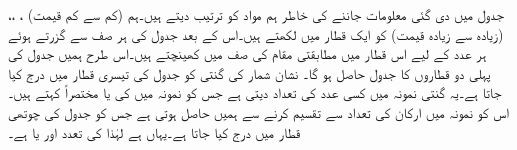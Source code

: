جدول  میں دی گئی معلومات جاننے کی خاطر ہم مواد کو ترتیب دیتے ہیں۔ہم (کم سے کم قیمت) ، ،،  (زیادہ سے زیادہ قیمت) کو ایک قطار میں لکھتے ہیں۔اس کے بعد جدول  کی ہر صف سے گزرتے ہوئے ہر عدد کے لیے اس قطار میں مطابقتی مقام کی صف میں  کھینچتے ہیں۔اس طرح ہمیں جدول  کی پہلی دو قطاروں  کا جدول حاصل ہو گا۔ نشان شمار کی گنتی کو جدول کی تیسری قطار میں درج کیا جاتا ہے۔یہ گنتی نمونہ میں  کسی عدد  کی تعداد دیتی ہے جس کو نمونہ میں  کی  یا مختصراً  کہتے ہیں۔اس کو نمونہ میں ارکان کی تعداد  سے تقسیم کرنے سے ہمیں  حاصل ہوتی ہے جس کو جدول  کی چوتھی قطار میں درج کیا جاتا ہے۔یہاں  ہے لہٰذا کی تعدد  اور   یا  ہے۔
